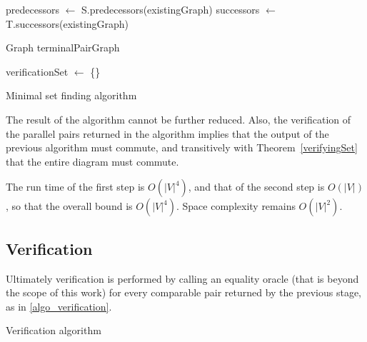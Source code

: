 \documentclass[sigplan,review,anonymous]{acmart}
\begin{document}
{\begin{algorithm}
predecessors $\gets$ S.predecessors(existingGraph)\;
successors $\gets$ T.successors(existingGraph)\;

Graph terminalPairGraph\;

verificationSet $\gets$ \{\}\;
\;
\caption{Minimal set finding algorithm}
\label{algo_online_minimal}
\end{algorithm}

The result of the algorithm cannot be further reduced.
Also, the verification of the parallel pairs returned in the algorithm implies that the output of the previous algorithm must commute, and transitively with Theorem~\ref{verifyingSet} that the entire diagram must commute.

The run time of the first step is $O(|V|^4)$, and that of the second step is $O(|V|)$, so that the overall bound is $O(|V|^4)$.
Space complexity remains $O(|V|^2)$.

\subsection{Verification}
Ultimately verification is performed by calling an equality oracle (that is beyond the scope of this work) for every comparable pair returned by the previous stage, as in \ref{algo_verification}.

\begin{algorithm}
\DontPrintSemicolon
{}
\;
\caption{Verification algorithm}\label{algo_verification}
\end{algorithm}

}
\end{document}
